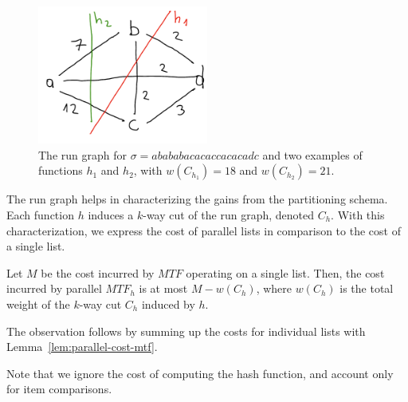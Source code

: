 \begin{figure}[h!]
	\center
	\includegraphics[width=0.5\textwidth]{./fig/cut.png}
	\caption{The run graph for $\sigma = abababacacaccacacadc$ and two examples of functions $h_1$ and $h_2$, with $w(C_{h_1}) = 18$ and $w(C_{h_2}) = 21$.}
	\label{fig:example}
\end{figure}




The run graph helps in characterizing the gains from the partitioning schema.
Each function $h$ induces a $k$-way cut of the run graph, denoted $C_h$.
With this characterization, we express the cost of parallel lists in comparison to the cost of a single list.
\begin{observation}
	Let $M$ be the cost incurred by $MTF$ operating on a single list.
	Then, the cost incurred by parallel $MTF_h$ is at most $M - w(C_h)$, where $w(C_h)$ is the total weight of the $k$-way cut $C_h$ induced by $h$.
\end{observation}

The observation follows by summing up the costs for individual lists with Lemma~\ref{lem:parallel-cost-mtf}.

Note that we ignore the cost of computing the hash function, and account only for item comparisons.


